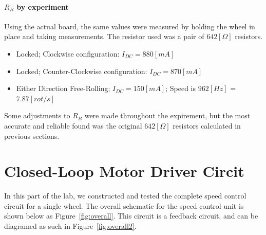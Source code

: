 \documentclass{hw}
\begin{document}
\subsection{$R_B$ by experiment}
Using the actual board, the same values were measured by holding the wheel in
place and taking measurements. The resistor used was a pair of $642[\Omega]$
resistors.
\begin{itemize}
  \item Locked; Clockwise configuration: $I_{DC}=880[mA]$
  \item Locked; Counter-Clockwise configuration: $I_{DC}=870[mA]$
  \item Either Direction Free-Rolling; $I_{DC}=150[mA]$; Speed is $962[Hz]$ = $7.87[rot/s]$ 
\end{itemize}
    Some adjustments to $R_B$ were made throughout the expirement,
    but the most accurate and reliable found was the original 
    $642[\Omega]$ resistors
    calculated in previous sections.
\part{Closed-Loop Motor Driver Circit}
  In this part of the lab, we constructed and tested the complete 
  speed control circuit for a single wheel. The overall schematic 
  for the speed control unit is shown below as
  Figure~\ref{fig:overall}. This circuit is a feedback circuit,
  and can be diagramed as such in Figure~\ref{fig:overall2}.
\end{document}

